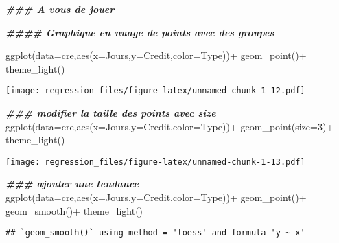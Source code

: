 \documentclass[
]{article}
\newenvironment{Shaded}{\begin{snugshade}}{\end{snugshade}}
\newcommand{\AttributeTok}[1]{\textcolor[rgb]{0.77,0.63,0.00}{#1}}
\newcommand{\DecValTok}[1]{\textcolor[rgb]{0.00,0.00,0.81}{#1}}
\newcommand{\DocumentationTok}[1]{\textcolor[rgb]{0.56,0.35,0.01}{\textbf{\textit{#1}}}}
\newcommand{\FunctionTok}[1]{\textcolor[rgb]{0.00,0.00,0.00}{#1}}
\newcommand{\NormalTok}[1]{#1}
\newcommand{\SpecialCharTok}[1]{\textcolor[rgb]{0.00,0.00,0.00}{#1}}
\begin{document}
\begin{Shaded}
\begin{Highlighting}[]
\DocumentationTok{\#\#\#  A vous de jouer}


\DocumentationTok{\#\#\#\# Graphique en nuage de points avec des groupes}

\FunctionTok{ggplot}\NormalTok{(}\AttributeTok{data=}\NormalTok{cre,}\FunctionTok{aes}\NormalTok{(}\AttributeTok{x=}\NormalTok{Jours,}\AttributeTok{y=}\NormalTok{Credit,}\AttributeTok{color=}\NormalTok{Type))}\SpecialCharTok{+}
  \FunctionTok{geom\_point}\NormalTok{()}\SpecialCharTok{+}
  \FunctionTok{theme\_light}\NormalTok{()}
\end{Highlighting}
\end{Shaded}

\texttt{[image: regression\_files/figure-latex/unnamed-chunk-1-12.pdf]}

\begin{Shaded}
\begin{Highlighting}[]
\DocumentationTok{\#\#\# modifier la taille des points avec size }
\FunctionTok{ggplot}\NormalTok{(}\AttributeTok{data=}\NormalTok{cre,}\FunctionTok{aes}\NormalTok{(}\AttributeTok{x=}\NormalTok{Jours,}\AttributeTok{y=}\NormalTok{Credit,}\AttributeTok{color=}\NormalTok{Type))}\SpecialCharTok{+}
  \FunctionTok{geom\_point}\NormalTok{(}\AttributeTok{size=}\DecValTok{3}\NormalTok{)}\SpecialCharTok{+}
  \FunctionTok{theme\_light}\NormalTok{()}
\end{Highlighting}
\end{Shaded}

\texttt{[image: regression\_files/figure-latex/unnamed-chunk-1-13.pdf]}

\begin{Shaded}
\begin{Highlighting}[]
\DocumentationTok{\#\#\# ajouter une tendance}
\FunctionTok{ggplot}\NormalTok{(}\AttributeTok{data=}\NormalTok{cre,}\FunctionTok{aes}\NormalTok{(}\AttributeTok{x=}\NormalTok{Jours,}\AttributeTok{y=}\NormalTok{Credit,}\AttributeTok{color=}\NormalTok{Type))}\SpecialCharTok{+}
  \FunctionTok{geom\_point}\NormalTok{()}\SpecialCharTok{+}
  \FunctionTok{geom\_smooth}\NormalTok{()}\SpecialCharTok{+}
  \FunctionTok{theme\_light}\NormalTok{()}
\end{Highlighting}
\end{Shaded}

\begin{verbatim}
## `geom_smooth()` using method = 'loess' and formula 'y ~ x'
\end{verbatim}
\end{document}
